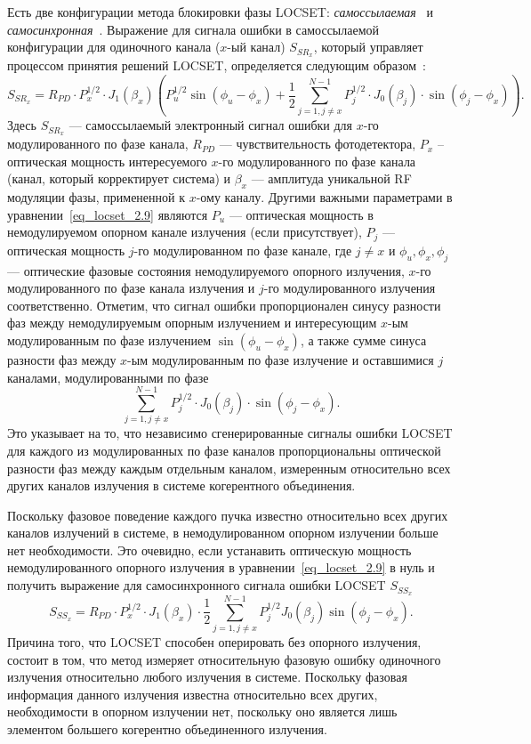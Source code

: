 Есть две конфигурации метода блокировки фазы LOCSET: \textit{самоссылаемая}~\cite{Locset35,Locset37,Locset41,Locset42} и \textit{самосинхронная}~\cite{Locset33,Locset34,Locset43}. Выражение для сигнала ошибки в самоссылаемой конфигурации  для одиночного канала ($x$-ый канал) $S_{SR_x}$, который управляет процессом принятия решений LOCSET, определяется следующим образом~\cite{Locset_pulford}:
\begin{equation}\label{eq_locset_2.9}
  S_{SR_x}=R_{PD}\cdot P_x^{1/2}\cdot J_1(\beta_x)\left(P_u^{1/2}\sin(\phi_u-\phi_x)+\frac{1}{2}\sum_{j=1, j\neq x}^{N-1}P_j^{1/2}\cdot J_0(\beta_j)\cdot\sin(\phi_j-\phi_x)\right).
\end{equation}
Здесь $S_{SR_x}$ --- самоссылаемый электронный сигнал ошибки для $x$-го модулированного по фазе канала, $R_{PD}$ --- чувствительность фотодетектора, $P_x$ -- оптическая мощность интересуемого $x$-го модулированного по фазе канала (канал, который корректирует система) и $\beta_x$ --- амплитуда уникальной RF модуляции фазы, примененной к $x$-ому каналу. Другими важными параметрами в уравнении~\eqref{eq_locset_2.9} являются $P_u$ --- оптическая мощность в немодулируемом опорном канале излучения (если присутствует), $P_j$ --- оптическая мощность $j$-го модулированном по фазе канале, где $j\neq x$ и $\phi_u, \phi_x, \phi_j$ --- оптические фазовые состояния немодулируемого опорного излучения, $x$-го модулированного по фазе канала излучения и $j$-го модулированного излучения соответственно. Отметим, что сигнал ошибки пропорционален синусу разности фаз между немодулируемым опорным излучением и интересующим $x$-ым модулированным по фазе излучением $\sin(\phi_u-\phi_x)$, а также сумме синуса разности фаз между $x$-ым модулированным по фазе излучение и оставшимися $j$ каналами, модулированными по фазе
$$
  \sum_{j=1, j\neq x}^{N-1}P_j^{1/2}\cdot J_0(\beta_j)\cdot\sin(\phi_j-\phi_x).
$$
Это указывает на то, что независимо сгенерированные сигналы ошибки LOCSET для каждого из модулированных по фазе каналов пропорциональны оптической разности фаз между каждым отдельным каналом, измеренным относительно всех других каналов излучения в системе когерентного объединения.

Поскольку фазовое поведение каждого пучка известно относительно всех других каналов излучений в системе, в немодулированном опорном излучении больше нет необходимости. Это очевидно, если устанавить оптическую мощность немодулированного опорного излучения в уравнении~\eqref{eq_locset_2.9} в нуль и получить выражение для самосинхронного сигнала ошибки LOCSET $S_{SS_x}$~\cite{Locset33,Locset34,Locset43}
\begin{equation}\label{eq_locset_2.10}
  S_{SS_x}=R_{PD}\cdot P_x^{1/2}\cdot J_1(\beta_x)\cdot\frac{1}{2}\sum_{j=1, j\neq x}^{N-1}P_j^{1/2}J_0(\beta_j)\sin(\phi_j-\phi_x).
\end{equation}
Причина того, что LOCSET способен оперировать без опорного излучения, состоит в том, что метод измеряет относительную фазовую ошибку одиночного излучения относительно любого излучения в системе. Поскольку фазовая информация данного излучения известна относительно всех других, необходимости в опорном излучении нет, поскольку оно является лишь элементом большего когерентно объединенного излучения.

